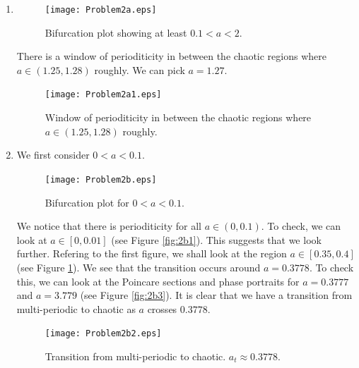 \documentclass{article}
\theoremstyle{definition}
\begin{document}
\begin{enumerate}[label=(\alph*)]
	\item 
	\begin{figure}[!htb]
		\centering
		\texttt{[image: Problem2a.eps]}
		\caption{Bifurcation plot showing at least $0.1 < a < 2$. }
	\end{figure}
	There is a window of perioditicity in between the chaotic regions where $a \in (1.25,1.28)$ roughly. We can pick $a = 1.27$.
	\begin{figure}[!htb]
		\centering
		\texttt{[image: Problem2a1.eps]}
		\caption{Window of perioditicity in between the chaotic regions where $a \in (1.25,1.28)$ roughly. }
	\end{figure}


	\item We first consider $0 < a < 0.1$. 
	\begin{figure}[!htb]
		\centering
		\texttt{[image: Problem2b.eps]}
		\caption{Bifurcation plot for $0 < a < 0.1$. }
	\end{figure}


	We notice that there is perioditicity for all $a\in (0,0.1)$. To check, we can look at $a \in [0,0.01]$ (see Figure \ref{fig:2b1}). This suggests that we look further. Refering to the first figure, we shall look at the region $a\in [0.35,0.4]$ (see Figure \ref{fig:2b2}). We see that the transition occurs around $\boxed{a = 0.3778}$. To check this, we can look at the Poincare sections and phase portraits for $a = 0.3777$ and $a = 3.779$ (see Figure \ref{fig:2b3}). It is clear that we have a transition from multi-periodic to chaotic as $a$ crosses $0.3778$. 
	
	
	 
	\begin{figure}[!htb]
		\centering
		\texttt{[image: Problem2b2.eps]}
		\caption{Transition from multi-periodic to chaotic. $a_t\approx 0.3778$. }
		\label{fig:2b2}
	\end{figure}



\end{enumerate}
\end{document}
